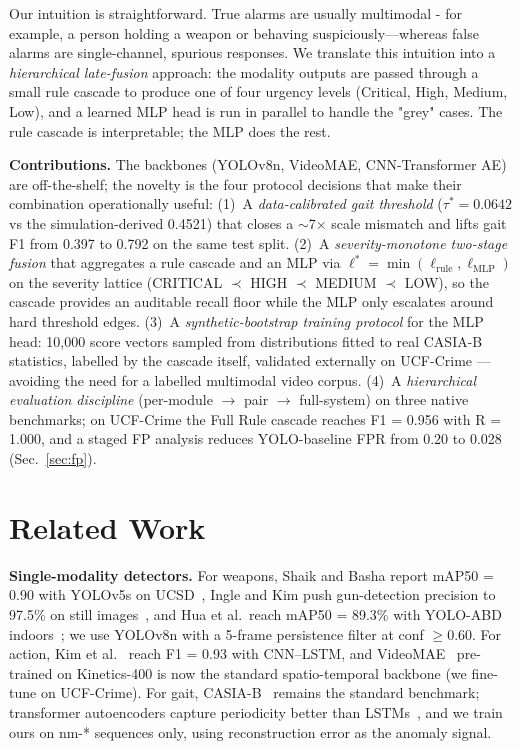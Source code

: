 \documentclass[runningheads]{llncs}
\begin{document}
Our intuition is straightforward. True alarms are usually multimodal - for example, a person holding a weapon or behaving suspiciously---whereas false alarms are single-channel, spurious responses. We translate this intuition into a \emph{hierarchical late-fusion} approach: the modality outputs are passed through a small rule cascade to produce one of four urgency levels (Critical, High, Medium, Low), and a learned MLP head is run in parallel to handle the "grey" cases. The rule cascade is interpretable; the MLP does the rest.

\textbf{Contributions.} The backbones (YOLOv8n, VideoMAE, CNN-Transformer AE) are off-the-shelf; the novelty is the four protocol decisions that make their combination operationally useful: (1)~A \emph{data-calibrated gait threshold} ($\tau^* = 0.0642$ vs the simulation-derived 0.4521) that closes a $\sim$7$\times$ scale mismatch and lifts gait F1 from 0.397 to 0.792 on the same test split. (2)~A \emph{severity-monotone two-stage fusion} that aggregates a rule cascade and an MLP via $\ell^* = \min(\ell_\text{rule}, \ell_\text{MLP})$ on the severity lattice (CRITICAL $\prec$ HIGH $\prec$ MEDIUM $\prec$ LOW), so the cascade provides an auditable recall floor while the MLP only escalates around hard threshold edges. (3)~A \emph{synthetic-bootstrap training protocol} for the MLP head: 10{,}000 score vectors sampled from distributions fitted to real CASIA-B statistics, labelled by the cascade itself, validated externally on UCF-Crime --- avoiding the need for a labelled multimodal video corpus. (4)~A \emph{hierarchical evaluation discipline} (per-module $\to$ pair $\to$ full-system) on three native benchmarks; on UCF-Crime the Full Rule cascade reaches F1 = 0.956 with R = 1.000, and a staged FP analysis reduces YOLO-baseline FPR from 0.20 to 0.028 (Sec.~\ref{sec:fp}).

\section{Related Work}\label{sec:related}

\textbf{Single-modality detectors.} For weapons, Shaik and Basha report mAP50 = 0.90 with YOLOv5s on UCSD~\cite{shaik2025}, Ingle and Kim push gun-detection precision to 97.5\% on still images~\cite{ingle2022}, and Hua et al.\ reach mAP50 = 89.3\% with YOLO-ABD indoors~\cite{hua2024}; we use YOLOv8n with a 5-frame persistence filter at conf $\geq 0.60$. For action, Kim et al.~\cite{kim2024} reach F1 = 0.93 with CNN--LSTM, and VideoMAE~\cite{tong2022} pre-trained on Kinetics-400 is now the standard spatio-temporal backbone (we fine-tune on UCF-Crime). For gait, CASIA-B~\cite{casiab} remains the standard benchmark; transformer autoencoders capture periodicity better than LSTMs~\cite{veesam2025}, and we train ours on nm-* sequences only, using reconstruction error as the anomaly signal.
\end{document}
